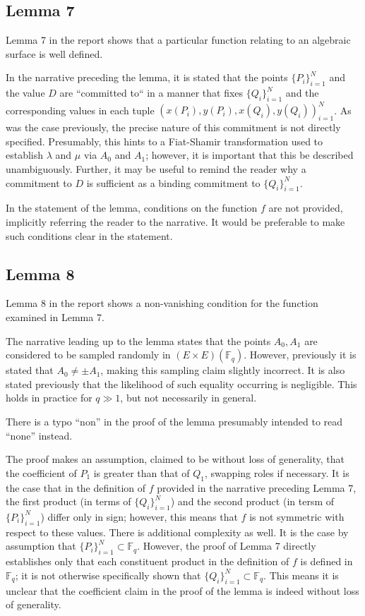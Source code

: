 \documentclass{article}
\begin{document}
\subsection{Lemma 7}

Lemma 7 in the report shows that a particular function relating to an algebraic surface is well defined.

In the narrative preceding the lemma, it is stated that the points $\{ P_i \}_{i=1}^N$ and the value $D$ are ``committed to`` in a manner that fixes $\{ Q_i \}_{i=1}^N$ and the corresponding values in each tuple $( x(P_i), y(P_i), x(Q_i), y(Q_i) )_{i=1}^N$.
As was the case previously, the precise nature of this commitment is not directly specified.
Presumably, this hints to a Fiat-Shamir transformation used to establish $\lambda$ and $\mu$ via $A_0$ and $A_1$; however, it is important that this be described unambiguously.
Further, it may be useful to remind the reader why a commitment to $D$ is sufficient as a binding commitment to $\{ Q_i \}_{i=1}^N$.

In the statement of the lemma, conditions on the function $f$ are not provided, implicitly referring the reader to the narrative.
It would be preferable to make such conditions clear in the statement.


\subsection{Lemma 8}

Lemma 8 in the report shows a non-vanishing condition for the function examined in Lemma 7.

The narrative leading up to the lemma states that the points $A_0, A_1$ are considered to be sampled randomly in $(E \times E)(\mathbb{F}_q)$.
However, previously it is stated that $A_0 \neq \pm A_1$, making this sampling claim slightly incorrect.
It is also stated previously that the likelihood of such equality occurring is negligible.
This holds in practice for $q \gg 1$, but not necessarily in general.

There is a typo ``non'' in the proof of the lemma presumably intended to read ``none'' instead.

The proof makes an assumption, claimed to be without loss of generality, that the coefficient of $P_1$ is greater than that of $Q_1$, swapping roles if necessary.
It is the case that in the definition of $f$ provided in the narrative preceding Lemma 7, the first product (in terms of $\{ Q_i \}_{i=1}^N$) and the second product (in tersm of $\{ P_i \}_{i=1}^N$) differ only in sign; however, this means that $f$ is not symmetric with respect to these values.
There is additional complexity as well.
It is the case by assumption that $\{ P_i \}_{i=1}^N \subset \mathbb{F}_q$.
However, the proof of Lemma 7 directly establishes only that each constituent product in the definition of $f$ is defined in $\mathbb{F}_q$; it is not otherwise specifically shown that $\{ Q_i \}_{i=1}^N \subset \mathbb{F}_q$.
This means it is unclear that the coefficient claim in the proof of the lemma is indeed without loss of generality.
\end{document}
